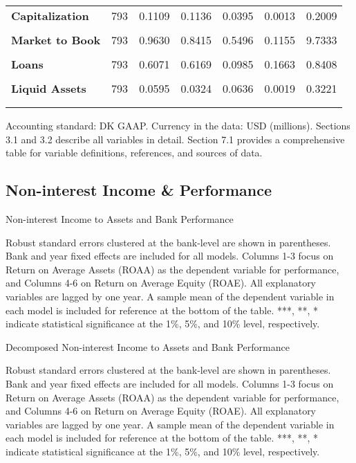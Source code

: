 \documentclass[10pt]{article} %
\begin{document}
\begin{table}[H]
{\begin{tabular}{lcccccc}
\textbf{Capitalization} & 793 & 0.1109 & 0.1136 & 0.0395 & 0.0013 & 0.2009 \\\\
\textbf{Market to Book} & 793 & 0.9630 & 0.8415 & 0.5496 & 0.1155 & 9.7333\\\\
\textbf{Loans} & 793 & 0.6071 & 0.6169 & 0.0985 & 0.1663 & 0.8408 \\\\
\textbf{Liquid Assets} & 793
& 0.0595 & 0.0324 & 0.0636 & 0.0019 & 0.3221 \\\\
\hline\hline \\
\end{tabular}}
\end{table}
\small{Accounting standard: DK GAAP. Currency in the data: USD (millions). Sections 3.1 and 3.2 describe all variables in detail. Section 7.1 provides a comprehensive table for variable definitions, references, and sources of data.}




\newpage 
\thispagestyle{plain}
\subsection{Non-interest Income \& Performance}

\begin{table}[H]
    \centering
  \caption{Non-interest Income to Assets and Bank Performance}
    {\renewcommand\normalsize{\small}%
    \normalsize
    }
\end{table}
\noindent\small{Robust standard errors clustered at the bank-level are shown in parentheses. Bank and year fixed effects are included for all models. Columns 1-3 focus on Return on Average Assets (ROAA) as the dependent variable for performance, and Columns 4-6 on Return on Average Equity (ROAE). All explanatory variables are lagged by one year. A sample mean of the dependent variable in each model is included for reference at the bottom of the table. ***, **, * indicate statistical significance at the 1\%, 5\%, and 10\% level, respectively.}
\newpage 

\thispagestyle{plain}
\begin{table}[H]
    \centering
  \caption{Decomposed Non-interest Income to Assets and Bank Performance}
    {\renewcommand\normalsize{\small}%
    \normalsize
    }
\end{table}
\noindent\small{Robust standard errors clustered at the bank-level are shown in parentheses. Bank and year fixed effects are included for all models. Columns 1-3 focus on Return on Average Assets (ROAA) as the dependent variable for performance, and Columns 4-6 on Return on Average Equity (ROAE). All explanatory variables are lagged by one year. A sample mean of the dependent variable in each model is included for reference at the bottom of the table. ***, **, * indicate statistical significance at the 1\%, 5\%, and 10\% level, respectively.}
\newpage 
\end{document}
